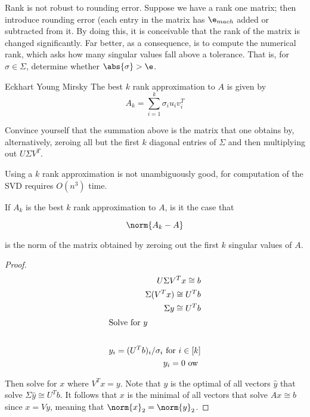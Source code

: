 \documentclass[../main.tex]{subfiles}
\begin{document}
\begin{remark}
    Rank is not robust to rounding error. Suppose we have a rank one matrix; then introduce rounding error (each entry in the matrix has $\e_{mach}$ added or subtracted from it. By doing this, it is conceivable that the rank of the matrix is changed significantly. Far better, as a consequence, is to compute the numerical rank, which asks how many singular values fall above a tolerance. That is, for $\sigma \in \Sigma$, determine whether $\abs{\sigma} > \e$.
\end{remark}

\begin{theorem}{Eckhart Young Mirsky}
   The best $k$ rank approximation to $A$ is given by
   \[
       A_k = \sum_{i=1}^{k}\sigma_{i}u_{i}v_{i}^T
   \]
\end{theorem}
\begin{remark}
       Convince yourself that the summation above is the matrix
       that one obtains by, alternatively, zeroing all but the first
       $k$ diagonal entries of $\Sigma$ and then multiplying out
       $U \Sigma V^T$.
\end{remark}

\begin{remark}
    Using a $k$ rank approximation is not unambiguously good, for computation of the SVD requires $O(n^3)$ time.
\end{remark}

\begin{unresolved}
    If $A_k$ is the best $k$ rank approximation to $A$, is it the case that

    \[
        \norm{A_k - A}
    \]

    is the norm of the matrix obtained by zeroing out the first $k$ singular values of $A$.
\end{unresolved}

\begin{theorem}
    
\end{theorem}
\begin{proof}
    \begin{align*}
        U \Sigma V^T x \cong b \\
        \Sigma (V^Tx) \cong U^T b\\
        \Sigma y \cong U^T b \\
        \intertext{Solve for $y$} \\
        y_i = (U^Tb)_i/\sigma_i \text{ for } i\in [k]\\
        y_i = 0 \text{ ow }\\
    \end{align*}

    Then solve for $x$ where $V^Tx = y$. Note that $y$ is the optimal of all vectors $\hat{y}$ that solve $\Sigma \hat{y} \cong U^Tb$. It follows that $x$ is the minimal of all vectors that solve $Ax \cong b$ since $x = Vy$, meaning that $\norm{x}_2 = \norm{y}_2$.
\end{proof}
\end{document}
